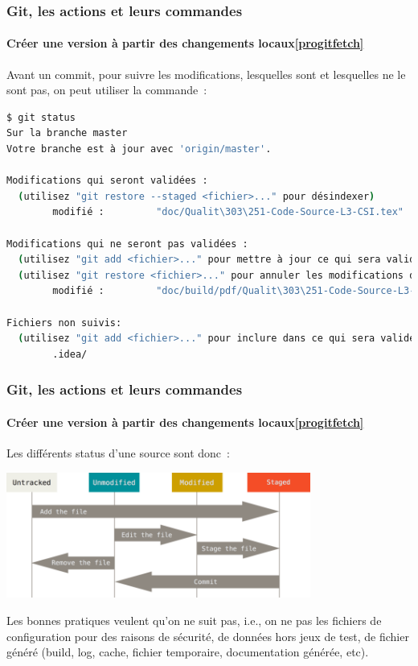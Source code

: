 \documentclass{beamer}
\begin{document}
    \begin{frame}[fragile]
        \frametitle{Git, les actions et leurs commandes}
        \framesubtitle{Créer une version à partir des changements locaux\cref{progitfetch}}
        \transdissolve

        Avant un commit, pour suivre les modifications, lesquelles sont  et lesquelles ne le sont pas, on peut utiliser la commande~:
        \begin{lstlisting}[language=sh]
$ git status
Sur la branche master
Votre branche est à jour avec 'origin/master'.

Modifications qui seront validées :
  (utilisez "git restore --staged <fichier>..." pour désindexer)
        modifié :         "doc/Qualit\303\251-Code-Source-L3-CSI.tex"

Modifications qui ne seront pas validées :
  (utilisez "git add <fichier>..." pour mettre à jour ce qui sera validé)
  (utilisez "git restore <fichier>..." pour annuler les modifications dans le répertoire de travail)
        modifié :         "doc/build/pdf/Qualit\303\251-Code-Source-L3-CSI.pdf"

Fichiers non suivis:
  (utilisez "git add <fichier>..." pour inclure dans ce qui sera validé)
        .idea/
        \end{lstlisting}

    \end{frame}

    \begin{frame}
        \frametitle{Git, les actions et leurs commandes}
        \framesubtitle{Créer une version à partir des changements locaux\cref{progitfetch}}
        \transdissolve

        Les différents status d'une source sont donc~:

        \begin{center}
            \includegraphics[width=10cm]{image/git-lifecycle.png}
        \end{center}

        \begin{dangercolorbox}
            Les bonnes pratiques veulent qu'on ne suit pas, i.e., on ne  pas les fichiers de configuration pour des raisons de sécurité, de données hors jeux de test, de fichier généré (build, log, cache, fichier temporaire, documentation générée, etc).
        \end{dangercolorbox}
    \end{frame}
\end{document}
